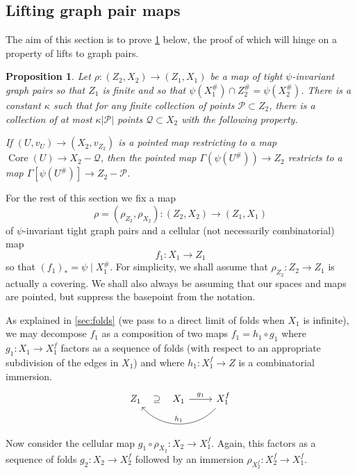 \documentclass[11pt, a4paper]{amsart}
\newtheorem{proposition}[theorem]{Proposition}
\theoremstyle{definition}
\DeclareMathOperator{\core}{Core}
\begin{document}
\subsection{Lifting graph pair maps}

The aim of this section is to prove \cref{prop:preimage_cut} below, the proof of which will hinge on a property of lifts to graph pairs.

\begin{proposition}
\label{prop:preimage_cut}
Let $\rho\colon (Z_2, X_2)\to (Z_1, X_1)$ be a map of tight $\psi$-invariant graph pairs so that $Z_1$ is finite and so that $\psi(X^{\#}_1)\cap Z^{\#}_2= \psi(X^{\#}_2)$. There is a constant $\kappa$ such that for any finite collection of points $\mathcal{P}\subset Z_2$, there is a collection of at most $\kappa|\mathcal{P}|$ points $\mathcal{Q}\subset X_2$ with the following property. 

If $(U, v_U)\to (X_2, v_{Z_2})$ is a pointed map restricting to a map $\core(U)\to X_2 - \mathcal{Q}$, then the pointed map $\Gamma(\psi(U^{\#}))\to Z_2$ restricts to a map $\Gamma[\psi(U^{\#})]\to Z_2 - \mathcal{P}$.
\end{proposition}


 

For the rest of this section we fix a map
\[
\rho = (\rho_{Z_2}, \rho_{X_2}) \colon (Z_2, X_2) \to (Z_1, X_1)
\]
of $\psi$-invariant tight graph pairs and a cellular (not necessarily combinatorial) map
\[
f_1\colon X_1\to Z_1
\]
so that $(f_1)_* = \psi\mid X_1^{\#}$. For simplicity, we shall assume that $\rho_{Z_2}\colon Z_2\to Z_1$ is actually a covering. We shall also always be assuming that our spaces and maps are pointed, but suppress the basepoint from the notation.

As explained in \cref{sec:folds} (we pass to a direct limit of folds when $X_1$ is infinite), we may decompose $f_1$ as a composition of two maps $f_1 = h_1\circ g_1$ where $g_1\colon X_1\to X_1^f$ factors as a sequence of folds (with respect to an appropriate subdivision of the edges in $X_1$) and where $h_1\colon X_1^f\to Z$ is a combinatorial immersion.
\[
\begin{tikzcd}
Z_1                     & X_1 \arrow[r, "g_1"] \arrow[l, phantom, sloped, "\supseteq"]                     & X_1^f \arrow[ll, "h_1"', bend left=49]            
\end{tikzcd}
\]
Now consider the cellular map $g_1\circ\rho_{X_2}\colon X_2\to X_1^f$. Again, this factors as a sequence of folds $g_2\colon X_2\to X_2^f$ followed by an immersion $\rho_{X_2^f}\colon X_2^f\to X_1^f$. 
\end{document}
